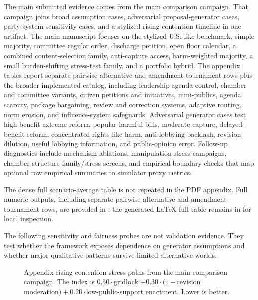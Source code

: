 \documentclass[manuscript]{acmart}
\begin{document}
The main submitted evidence comes from the main comparison campaign. That campaign joins broad assumption cases, adversarial proposal-generator cases, party-system sensitivity cases, and a stylized rising-contention timeline in one artifact. The main manuscript focuses on the stylized U.S.-like benchmark, simple majority, committee regular order, discharge petition, open floor calendar, a combined content-selection family, anti-capture access, harm-weighted majority, a small burden-shifting stress-test family, and a portfolio hybrid. The appendix tables report separate pairwise-alternative and amendment-tournament rows plus the broader implemented catalog, including leadership agenda control, chamber and committee variants, citizen petitions and initiatives, mini-publics, agenda scarcity, package bargaining, review and correction systems, adaptive routing, norm erosion, and influence-system safeguards. Adversarial generator cases test high-benefit extreme reform, popular harmful bills, moderate capture, delayed-benefit reform, concentrated rights-like harm, anti-lobbying backlash, revision dilution, useful lobbying information, and public-opinion error. Follow-up diagnostics include mechanism ablations, manipulation-stress campaigns, chamber-structure family/stress screens, and empirical boundary checks that map optional raw empirical summaries to simulator proxy metrics.



The dense full scenario-average table is not repeated in the PDF appendix. Full numeric outputs, including separate pairwise-alternative and amendment-tournament rows, are provided in ; the generated LaTeX full table remains in  for local inspection.

The following sensitivity and fairness probes are not validation evidence. They test whether the framework exposes dependence on generator assumptions and whether major qualitative patterns survive limited alternative worlds.






\begin{figure}
  \centering
  \resizebox{0.9\linewidth}{!}{}
  \caption{Appendix rising-contention stress paths from the main comparison campaign. The index is \(0.50\cdot\)gridlock \(+0.30\cdot(1-\)revision moderation\()+0.20\cdot\)low-public-support enactment. Lower is better.}
  \label{fig:appendix-timeline-contention}
\end{figure}
\end{document}
